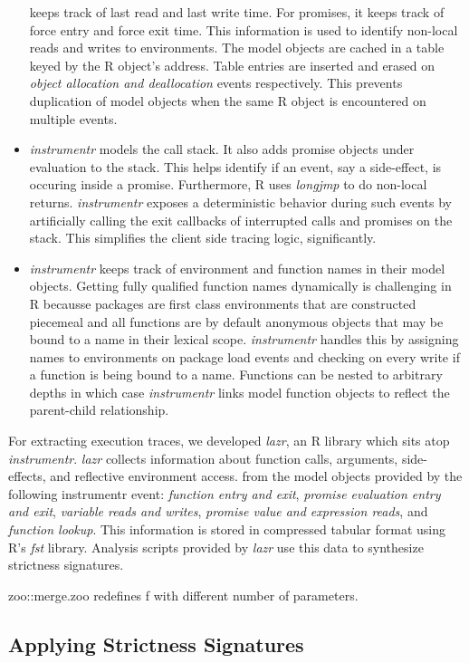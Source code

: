 \documentclass[screen,acmsmall]{acmart}
\begin{document}
\begin{itemize}
keeps track of last read and last write time. For promises, it keeps track of
force entry and force exit time. This information is used to identify non-local
reads and writes to environments. The model objects are cached in a table keyed
by the R object's address. Table entries are inserted and erased on \emph{object
  allocation and deallocation} events respectively. This prevents duplication of
model objects when the same R object is encountered on multiple events.
\item \emph{instrumentr} models the call stack. It also adds promise objects under
evaluation to the stack. This helps identify if an event, say a side-effect, is
occuring inside a promise. Furthermore, R uses \emph{longjmp} to do non-local
returns. \emph{instrumentr} exposes a deterministic behavior during such events
by artificially calling the exit callbacks of interrupted calls and promises on
the stack. This simplifies the client side tracing logic, significantly.
\item \emph{instrumentr} keeps track of environment and function names in their model
objects. Getting fully qualified function names dynamically is challenging in R
becausse packages are first class environments that are constructed piecemeal
and all functions are by default anonymous objects that may be bound to a name
in their lexical scope. \emph{instrumentr} handles this by assigning names to
environments on package load events and checking on every write if a function is
being bound to a name. Functions can be nested to arbitrary depths in which case
\emph{instrumentr} links model function objects to reflect the parent-child
relationship.
\end{itemize}

For extracting execution
traces, we developed \emph{lazr}, an R library which sits atop
\emph{instrumentr}. \emph{lazr} collects information about function calls,
arguments, side-effects, and reflective environment access. from the model
objects provided by the following instrumentr event: \emph{function entry and
  exit}, \emph{promise evaluation entry and exit}, \emph{variable reads and
  writes}, \emph{promise value and expression reads}, and \emph{function
  lookup}. This information is stored in compressed tabular format using R's
\emph{fst} library. Analysis scripts provided by \emph{lazr} use this data to
synthesize strictness signatures.

zoo::merge.zoo redefines f with different number of parameters.

\subsection{Applying Strictness Signatures}
\end{document}
